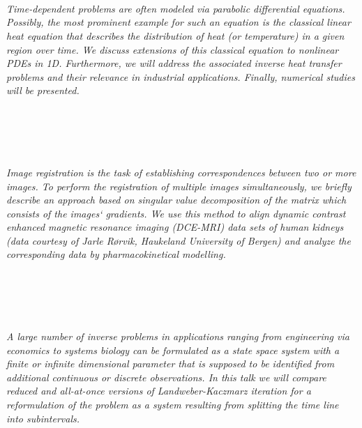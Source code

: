 \begin{multicols}{2}
        \\\\
\\
      \textit{Time-dependent problems are often modeled via parabolic differential equations. Possibly, the most prominent example for such an equation is the classical linear heat equation that describes the distribution of heat (or temperature) in a given region over time. We discuss extensions of this classical equation to nonlinear PDEs in 1D. Furthermore, we will address the associated inverse heat transfer problems and their relevance in industrial applications. Finally, numerical studies will be presented.}\\
\\ 
        \\
        \\\\
\\
      \textit{Image registration is the task of establishing correspondences between two or more images. To perform the registration of multiple images simultaneously, we briefly describe an approach based on singular value decomposition of the matrix which consists of the images‘ gradients. We use this method to align dynamic contrast enhanced magnetic resonance imaging (DCE-MRI) data sets of human kidneys (data courtesy of Jarle Rørvik, Haukeland University of Bergen) and analyze the corresponding data by pharmacokinetical modelling.}\\
\\ 
        \\
        \\\\
\\
      \textit{A large number of inverse problems in applications ranging from engineering via economics to systems biology can be formulated as a state space system with a finite or infinite dimensional parameter that is supposed to be identified from additional continuous or discrete observations. In this talk we will compare reduced and all-at-once versions of Landweber-Kaczmarz iteration for a reformulation of the problem as a system resulting from splitting the time line into
subintervals.}\\
\\ 
        \\
        \\\\
\\
\end{multicols}
